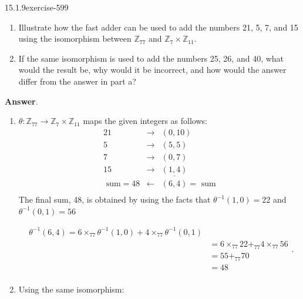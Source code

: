 \documentclass[twoside,10pt,]{book}
\numberwithin{equation}{section}
\begin{document}
\begin{divisionsolution}{15.1.9}{}{exercise-599}%
\hypertarget{p-5359}{}%
\leavevmode%
\begin{enumerate}[label=(\alph*)]
\item\hypertarget{li-2407}{}\hypertarget{p-5360}{}%
Illustrate how the fast adder can be used to add the numbers 21, 5, 7, and 15 using the isomorphism between \(\mathbb{Z}_{77}\) and \(\mathbb{Z}_7\times \mathbb{Z}_{11}\).%
\item\hypertarget{li-2408}{}\hypertarget{p-5361}{}%
If the same isomorphism is used to add the numbers 25, 26, and 40, what would the result be, why would it be incorrect, and how would the answer differ from the answer in part a?%
\end{enumerate}
%
\par\smallskip%
\noindent\textbf{Answer}.\quad%
\hypertarget{p-5362}{}%
\leavevmode%
\begin{enumerate}[label=(\alph*)]
\item\hypertarget{li-2409}{}\hypertarget{p-5363}{}%
\(\theta :\mathbb{Z}_{77} \to  \mathbb{Z}_7 \times  \mathbb{Z}_{11}\) maps the given integers as follows:%
\begin{equation*}
\begin{array}{ccc}
21 & \to  & (0,10) \\
5 & \to  & (5,5) \\
7 & \to  & (0,7) \\
15 & \to  & \underline{(1,4)} \\
\textrm{ sum}=48 & \leftarrow  & (6,4)=\textrm{ sum} \\
\end{array}
\end{equation*}
The final sum, 48, is obtained by using the facts that \(\theta ^{-1}(1,0) =22\) and \(\theta ^{-1}(0,1)=56\)%
\par
\hypertarget{p-5364}{}%
%
\begin{equation*}
\begin{split}
\theta^{-1}(6,4)= 6 \times_{77}\theta ^{-1}(1,0) + 4 \times_{77}\theta^{-1}(0,1)\\
& =6\times_{77}22 +_{77} 4\times_{77} 56\\
& =55 +_{77}70\\
& =48\\
\end{split}\text{.}
\end{equation*}
%
\item\hypertarget{li-2410}{}\hypertarget{p-5365}{}%
Using the same isomorphism:%

\end{enumerate}
\end{divisionsolution}
\end{document}
